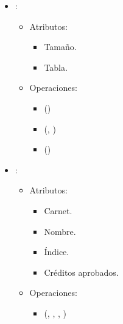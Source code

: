 \documentclass[11pt]{article}
\begin{document}
\begin{itemize}
      \item {}:
      
      \begin{itemize}
         \item Atributos:

         \begin{itemize}
            \item Tamaño.
            \item Tabla.
         \end{itemize}
      \end{itemize}

      \begin{itemize}
         \item Operaciones:
         
         \begin{itemize}
            \item {}()
            \item {}(, )
            \item {}()
         \end{itemize}
      \end{itemize}

      \item {}:
      \begin{itemize}
         \item Atributos:

         \begin{itemize}
            \item Carnet.
            \item Nombre.
            \item Índice.
            \item Créditos aprobados.
         \end{itemize}
      \end{itemize}

      \begin{itemize}
         \item Operaciones:
         
         \begin{itemize}
            \item {}(, , , )
         \end{itemize}
      \end{itemize}


\end{itemize}
\end{document}
